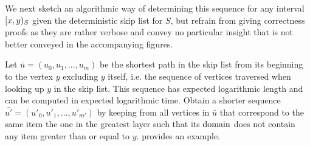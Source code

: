 We next sketch an algorithmic way of determining this sequence for any interval $[{x},{y})_{S}$ given the deterministic skip list for $S$, but refrain from giving correctness proofs as they are rather verbose and convey no particular insight that is not better conveyed in the accompanying figures.

Let $\bar{u} = (u_0, u_1, \ldots, u_m)$ be the shortest path in the skip list from its beginning to the vertex $y$ excluding $y$ itself, i.e. the sequence of vertices traversed when looking up $y$ in the skip list. This sequence has expected logarithmic length and can be computed in expected logarithmic time. Obtain a shorter sequence $\bar{u'} = (u'_0, u'_1, \ldots, u'_{m'})$ by keeping from all vertices in $\bar{u}$ that correspond to the same item the one in the greatest layer such that its $\operatorname{domain}$ does not contain any item greater than or equal to $y$.  provides an example.

